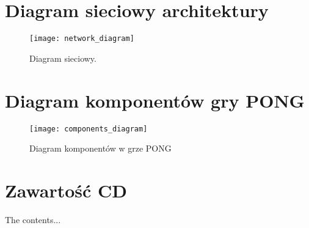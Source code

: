 \begin{appendices}

\newpage
\section{Diagram sieciowy architektury}
\label{app:network_diagram_app}
\begin{figure}[H]
\begin{center}
    \texttt{[image: network\_diagram]}
\end{center}
\caption{Diagram sieciowy.}
\label{fig:network_diagram}
\end{figure}

\newpage
\section{Diagram komponentów gry PONG}
\label{app:netwo}
\begin{figure}[H]
\begin{center}
    \texttt{[image: components\_diagram]}
\end{center}
\caption{Diagram komponentów w grze PONG}
\label{fig:network_diagram}
\end{figure}


\section{Zawartość CD}

The contents...

\end{appendices}
